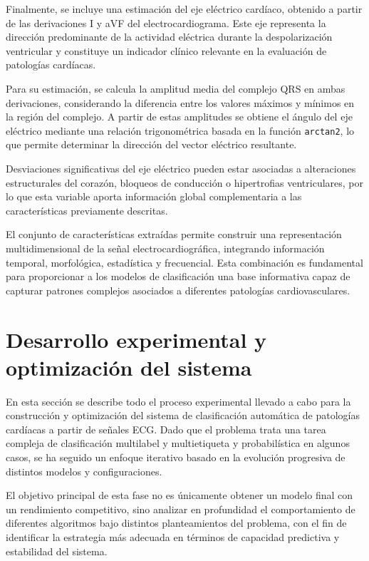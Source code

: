 \documentclass[12pt,a4paper,twoside]{book}
\begin{document}
Finalmente, se incluye una estimación del eje eléctrico cardíaco, obtenido a partir de las derivaciones I y aVF del electrocardiograma. 
Este eje representa la dirección predominante de la actividad eléctrica durante la despolarización ventricular y constituye un indicador clínico relevante en la evaluación de patologías cardíacas.

Para su estimación, se calcula la amplitud media del complejo QRS en ambas derivaciones, considerando la diferencia entre los valores máximos y mínimos en la región del complejo. 
A partir de estas amplitudes se obtiene el ángulo del eje eléctrico mediante una relación trigonométrica basada en la función \texttt{arctan2}, lo que permite determinar la dirección del vector eléctrico resultante.

Desviaciones significativas del eje eléctrico pueden estar asociadas a alteraciones estructurales del corazón, bloqueos de conducción o hipertrofias ventriculares, por lo que esta variable aporta información global complementaria a las características previamente descritas.


\vspace{0.5cm}

El conjunto de características extraídas permite construir una representación multidimensional de la señal electrocardiográfica, integrando información temporal, morfológica, estadística y frecuencial. 
Esta combinación es fundamental para proporcionar a los modelos de clasificación una base informativa capaz de capturar patrones complejos asociados a diferentes patologías cardiovasculares.

\section{Desarrollo experimental y optimización del sistema}

En esta sección se describe todo el proceso experimental llevado a cabo para la construcción y optimización del sistema de clasificación automática de patologías cardíacas a partir de señales ECG.
Dado que el problema trata una tarea compleja de clasificación multilabel y multietiqueta y probabilística en algunos casos, se ha seguido un enfoque iterativo basado en la evolución progresiva de distintos modelos y configuraciones.

El objetivo principal de esta fase no es únicamente obtener un modelo final con un rendimiento competitivo, sino analizar en profundidad el comportamiento de diferentes algoritmos bajo distintos planteamientos del problema, con el fin de identificar la estrategia más adecuada en términos de capacidad predictiva y estabilidad del sistema.
\end{document}
